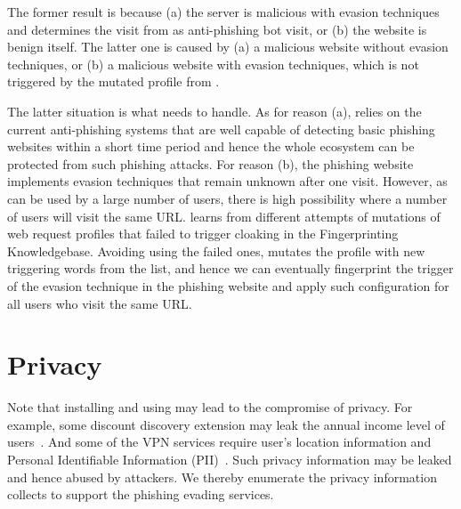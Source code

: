 The former result is because (a) the server is malicious with evasion techniques and determines the visit from \spartacus as anti-phishing bot visit, or (b) the website is benign itself.
The latter one is caused by (a) a malicious website without evasion techniques, or (b) a malicious website with evasion techniques, which is not triggered by the mutated profile from \spartacus.

The latter situation is what \spartacus needs to handle.
As for reason (a), \spartacus relies on the current anti-phishing systems that are well capable of detecting basic phishing websites within a short time period and hence the whole ecosystem can be protected from such phishing attacks.
For reason (b), the phishing website implements evasion techniques that remain unknown after one visit.
However, as \spartacus can be used by a large number of users, there is high possibility where a number of users will visit the same URL.
\spartacus learns from different attempts of mutations of web request profiles that failed to trigger cloaking in the Fingerprinting Knowledgebase.
Avoiding using the failed ones, \spartacus mutates the profile with new triggering words from the list, and hence we can eventually fingerprint the trigger of the evasion technique in the phishing website and apply such configuration for all \spartacus users who visit the same URL.






\section{Privacy}

Note that installing and using \spartacus may lead to the compromise of privacy.
For example, some discount discovery extension may leak the annual income level of users~\cite{honey}.
And some of the VPN services require user's location information and Personal Identifiable Information (PII)~\cite{ZenMate}.
Such privacy information may be leaked and hence abused by attackers.  
We thereby enumerate the privacy information \spartacus collects to support the phishing evading services.

